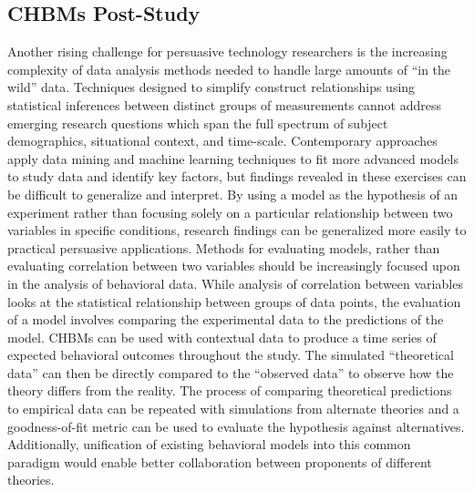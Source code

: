 \documentclass[runningheads,a4paper]{llncs}
\begin{document}
\subsection{CHBMs Post-Study}
Another rising challenge for persuasive technology researchers is the increasing complexity of data analysis methods needed to handle large amounts of ``in the wild'' data.
Techniques designed to simplify construct relationships using statistical inferences between distinct groups of measurements cannot address emerging research questions which span the full spectrum of subject demographics, situational context, and time-scale. 
Contemporary approaches apply data mining and machine learning techniques to fit more advanced models to study data and identify key factors, but findings revealed in these exercises can be difficult to generalize and interpret.
By using a model as the hypothesis of an experiment rather than focusing solely on a particular relationship between two variables in specific conditions, research findings can be generalized more easily to practical persuasive applications.
Methods for evaluating models, rather than evaluating correlation between two variables should be increasingly focused upon in the analysis of behavioral data.
While analysis of correlation between variables looks at the statistical relationship between groups of data points, the evaluation of a model involves comparing the experimental data to the predictions of the model.
CHBMs can be used with contextual data to produce a time series of expected behavioral outcomes throughout the study.
The simulated ``theoretical data'' can then be directly compared to the ``observed data'' to observe how the theory differs from the reality.
The process of comparing theoretical predictions to empirical data can be repeated with simulations from alternate theories and a goodness-of-fit metric can be used to evaluate the hypothesis against alternatives.
Additionally, unification of existing behavioral models into this common paradigm would enable better collaboration between proponents of different theories.
\end{document}
